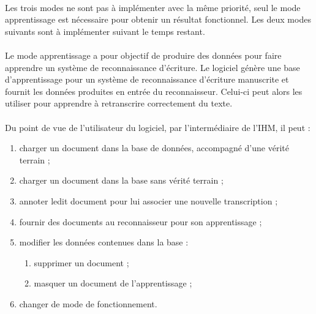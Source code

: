 \paragraph{}
Les trois modes ne sont pas à implémenter avec la même priorité, seul le mode
apprentissage est nécessaire pour obtenir un résultat fonctionnel. Les deux
modes suivants sont à implémenter suivant le temps restant.

\paragraph{}
Le mode apprentissage a pour objectif de produire des données pour faire apprendre un système de reconnaissance d’écriture. 
Le logiciel génère une base d’apprentissage pour un
système de reconnaissance d’écriture manuscrite et fournit les données
produites en entrée du reconnaisseur. Celui-ci peut alors les utiliser pour
apprendre à retranscrire correctement du texte.

\paragraph{}
Du point de vue de l'utilisateur du logiciel, par l’intermédiaire de l’IHM, il
peut :
\begin{enumerate}
\item charger un document dans la base de données, accompagné d’une vérité
terrain ;
\item charger un document dans la base sans vérité terrain ;
\item annoter ledit document pour lui associer une nouvelle transcription ;
\item fournir des documents au reconnaisseur pour son apprentissage ;
\item modifier les données contenues dans la base :
\begin{enumerate}
\item supprimer un document ;
\item masquer un document de l’apprentissage ;
\end{enumerate}
\item changer de mode de fonctionnement.
\end{enumerate}

\newpage

